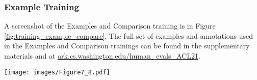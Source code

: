 \subsubsection{Example Training}\label{app:train_examples}
A screenshot of the Examples and Comparison training is in Figure \ref{fig:training_example_compare}. The full set of examples and annotations used in the Examples and Comparison trainings can be found in the supplementary materials and at \url{ark.cs.washington.edu/human_evals_ACL21}.

\begin{figure*}[]
\centering
\texttt{[image: images/Figure7\_8.pdf]}
\caption{The Example training (left) and Comparison training (right) in the story domain. The instructions are the same for both, except ``Choose the one you think was written by a machine.'' was in Comparison only.}
\label{fig:training_example_compare}
\end{figure*}